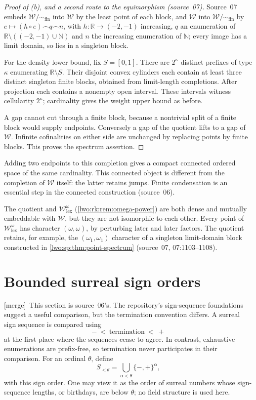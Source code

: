 \documentclass[11pt,a4paper]{article}
\theoremstyle{definition}
\theoremstyle{remark}
\newcommand{\R}{\mathbb R}
\newcommand{\N}{\mathbb N}
\newcommand{\W}{\mathcal W}
\newcommand{\lex}{\mathrm{lex}}
\newcommand{\cat}{\mathbin{\frown}}
\newcommand{\Wq}{\W/{\sim_{\mathrm{fin}}}}
\newcommand{\merge}{\textsf{[merge]}}
\begin{document}
\begin{proof}[Proof of \textup{(b)}, and a second route to the equimorphism \textup{(source~07)}]
Source~07 embeds $\Wq$ into $\W$ by the least point of each block, and $\W$
into $\Wq$ by $e\mapsto(h\circ e)\cat q\cat n$, with $h:\R\to(-2,-1)$
increasing, $q$ an enumeration of $\R\setminus((-2,-1)\cup\N)$ and $n$ the
increasing enumeration of $\N$; every image has a limit domain, so lies in a
singleton block.

For the density lower bound, fix $S=[0,1]$. There are $2^\kappa$ distinct
prefixes of type $\kappa$ enumerating $\R\setminus S$. Their disjoint convex
cylinders each contain at least three distinct singleton finite blocks,
obtained from limit-length completions. After projection each contains a
nonempty open interval. These intervals witness cellularity $2^\kappa$;
cardinality gives the weight upper bound as before.

A gap cannot cut through a finite block, because a nontrivial split of a
finite block would supply endpoints. Conversely a gap of the quotient lifts to
a gap of $\W$. Infinite cofinalities on either side are unchanged by replacing
points by finite blocks. This proves the spectrum assertion.
\end{proof}
Adding two endpoints to this completion gives a compact connected ordered space
of the same cardinality. This connected object is different from the
completion of $\W$ itself: the latter retains jumps. Finite condensation is an
essential step in the connected construction (source~06).

The quotient and $\W^\omega_{\lex}$ (\cref{lwo:rk:rem:omega-power}) are both
dense and mutually embeddable with $\W$, but they are not isomorphic to each
other. Every point of $\W^\omega_{\lex}$ has character $(\omega,\omega)$, by
perturbing later and later factors. The quotient retains, for example, the
$(\omega_1,\omega_1)$ character of a singleton limit-domain block constructed
in \cref{lwo:sp:thm:point-spectrum} (source~07, 07:1103--1108).

\section{Bounded surreal sign orders}\label{lwo:sp:sec:surreal}

\merge\ This section is source~06's. The repository's sign-sequence
foundations suggest a useful comparison, but the termination convention
differs. A surreal sign sequence is compared using
\[
 -\ <\ \text{termination}\ <\ +
\]
at the first place where the sequences cease to agree. In contrast,
exhaustive enumerations are prefix-free, so termination never participates in
their comparison. For an ordinal $\theta$, define
\[
 S_{<\theta}=\bigcup_{\alpha<\theta}\{-,+\}^\alpha,
\]
with this sign order. One may view it as the order of surreal numbers whose
sign-sequence lengths, or birthdays, are below $\theta$; no field structure is
used here.
\end{document}
